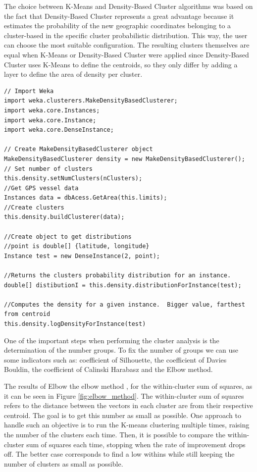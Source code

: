 The choice between K-Means and Density-Based Cluster algorithms was based on the fact that Density-Based Cluster represents a great advantage because it estimates the probability of the new geographic coordinates belonging to a cluster-based in the specific cluster probabilistic distribution. This way, the user can choose the most suitable configuration. The resulting clusters themselves are equal when K-Means or Density-Based Cluster were applied since Density-Based Cluster uses K-Means to define the centroids, so they only differ by adding a layer to define the area of density per cluster.
\\


\begin{lstlisting}
// Import Weka
import weka.clusterers.MakeDensityBasedClusterer;
import weka.core.Instances;
import weka.core.Instance;
import weka.core.DenseInstance;

// Create MakeDensityBasedClusterer object
MakeDensityBasedClusterer density = new MakeDensityBasedClusterer();
// Set number of clusters
this.density.setNumClusters(nClusters);
//Get GPS vessel data
Instances data = dbAcess.GetArea(this.limits);
//Create clusters
this.density.buildClusterer(data); 
		    	     
//Create object to get distributions 
//point is double[] {latitude, longitude}
Instance test = new DenseInstance(2, point); 

//Returns the clusters probability distribution for an instance.
double[] distibutionI = this.density.distributionForInstance(test);

//Computes the density for a given instance.  Bigger value, farthest from centroid
this.density.logDensityForInstance(test) 

\end{lstlisting}


One of the important steps when performing the cluster analysis is the determination of the number groups. To fix the number of groups we can use some indicators such as: coefficient of Silhouette, the coefficient of Davies Bouldin, the coefficient of Calinski Harabasz and the Elbow method. 

The results of Elbow the elbow method \cite{Kodinariya2013ReviewOD}, for the within-cluster sum of squares, as it can be seen in Figure \ref{fig:elbow_method}. The within-cluster sum of squares refers to the distance between the vectors in each cluster are from their respective centroid. The goal is to get this number as small as possible. One approach to handle such an objective is to run the K-means clustering multiple times, raising the number of the clusters each time. Then, it is possible to compare the within-cluster sum of squares each time, stopping when the rate of improvement drops off. The better case corresponds to find a low withins while still keeping the number of clusters as small as possible.\\

